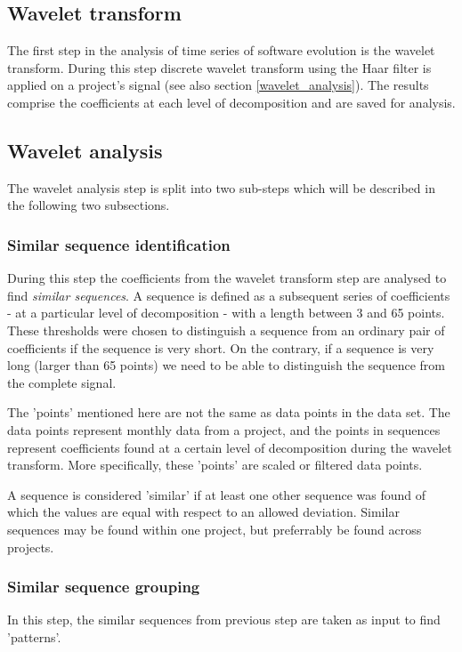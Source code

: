 \subsection{Wavelet transform}
The first step in the analysis of time series of software evolution is the
wavelet transform. During this step discrete wavelet transform using the Haar
filter is applied on a project's signal (see also section
\ref{wavelet_analysis}). The results comprise the coefficients at each level of
decomposition and are saved for analysis.

\subsection{Wavelet analysis}
The wavelet analysis step is split into two sub-steps which will be described in
the following two subsections.

\subsubsection{Similar sequence identification}
During this step the coefficients from the wavelet transform step are
analysed to find \emph{similar sequences}\rm. A sequence is defined as a
subsequent series of coefficients - at a particular level of decomposition -
with a length between 3 and 65 points.
These thresholds were chosen to distinguish a sequence from an ordinary pair of
coefficients if the sequence is very short. On the contrary, if a sequence is
very long (larger than 65 points) we need to be able to distinguish the
sequence from the complete signal.

The 'points' mentioned here are not the same as data points in the data set.
The data points represent monthly data from a project, and the points in
sequences represent coefficients found at a certain level of decomposition
during the wavelet transform. More specifically, these 'points' are scaled or
filtered data points.

A sequence is considered 'similar' if at least one other sequence was found of
which the values are equal with respect to an allowed deviation. Similar
sequences may be found within one project, but preferrably be found across
projects.

\subsubsection{Similar sequence grouping}
In this step, the similar sequences from previous step are taken as input to
find 'patterns'.

